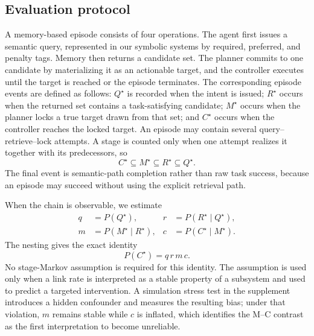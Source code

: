 \documentclass{article}
\begin{document}
\subsection{Evaluation protocol}
\label{sec:protocol}

A memory-based episode consists of four operations. The agent first issues a semantic query, represented in our symbolic systems by required, preferred, and penalty tags. Memory then returns a candidate set. The planner commits to one candidate by materializing it as an actionable target, and the controller executes until the target is reached or the episode terminates. The corresponding episode events are defined as follows: $Q^\star$ is recorded when the intent is issued; $R^\star$ occurs when the returned set contains a task-satisfying candidate; $M^\star$ occurs when the planner locks a true target drawn from that set; and $C^\star$ occurs when the controller reaches the locked target. An episode may contain several query--retrieve--lock attempts. A stage is counted only when one attempt realizes it together with its predecessors, so
\begin{equation}
C^\star \subseteq M^\star \subseteq R^\star \subseteq Q^\star.
\end{equation}
The final event is semantic-path completion rather than raw task success, because an episode may succeed without using the explicit retrieval path.

When the chain is observable, we estimate
\begin{equation}
\begin{aligned}
q&=P(Q^\star), & r&=P(R^\star\mid Q^\star),\\
m&=P(M^\star\mid R^\star), & c&=P(C^\star\mid M^\star).
\end{aligned}
\end{equation}
The nesting gives the exact identity
\begin{equation}
P(C^\star)=q\,r\,m\,c.
\end{equation}
No stage-Markov assumption is required for this identity. The assumption is used only when a link rate is interpreted as a stable property of a subsystem and used to predict a targeted intervention. A simulation stress test in the supplement introduces a hidden confounder and measures the resulting bias; under that violation, $m$ remains stable while $c$ is inflated, which identifies the M--C contrast as the first interpretation to become unreliable.
\end{document}

